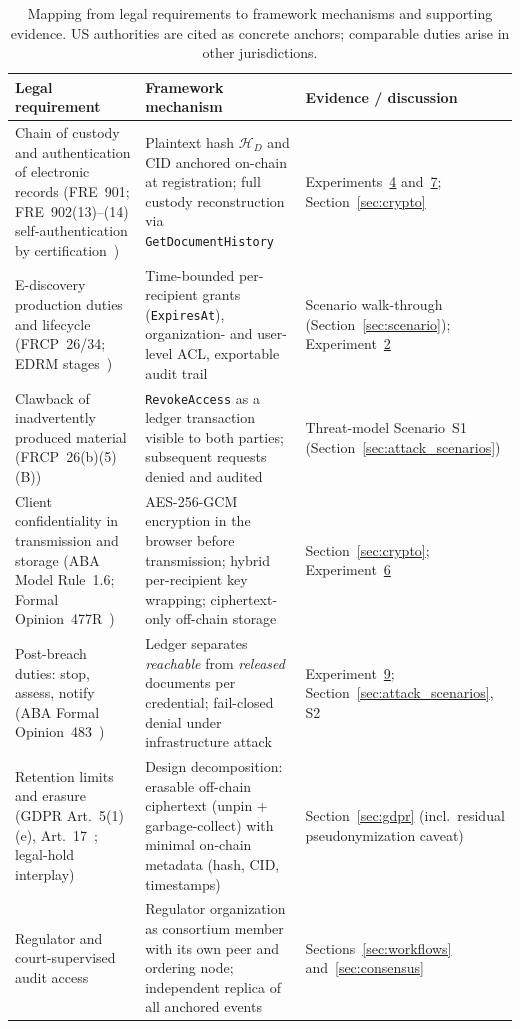 \documentclass[preprint,12pt]{elsarticle}
\begin{document}
\begin{table}[!t]
\centering
\scriptsize
\renewcommand{\arraystretch}{1.25}
\caption{Mapping from legal requirements to framework mechanisms and
supporting evidence. US authorities are cited as concrete anchors;
comparable duties arise in other jurisdictions.}
\label{tab:legal_mapping}
\begin{tabularx}{\textwidth}{@{} >{\raggedright\arraybackslash}p{3.6cm}
  >{\raggedright\arraybackslash}X
  >{\raggedright\arraybackslash}p{3.4cm} @{}}
\toprule
\textbf{Legal requirement} & \textbf{Framework mechanism} &
\textbf{Evidence / discussion} \\
\midrule
Chain of custody and authentication of electronic records
(FRE~901; FRE~902(13)--(14) self-authentication by
certification~\cite{fre902}) &
Plaintext hash $\mathcal{H}_D$ and CID anchored on-chain at
registration; full custody reconstruction via
\texttt{GetDocumentHistory} &
Experiments~\hyperref[sec:exp_audit]{4}
and~\hyperref[sec:exp_gethistory]{7};
Section~\ref{sec:crypto} \\
E-discovery production duties and lifecycle
(FRCP~26/34; EDRM stages~\cite{edrm2023}) &
Time-bounded per-recipient grants (\texttt{ExpiresAt}),
organization- and user-level ACL, exportable audit trail &
Scenario walk-through (Section~\ref{sec:scenario});
Experiment~\hyperref[sec:exp_latency]{2} \\
Clawback of inadvertently produced material
(FRCP~26(b)(5)(B)) &
\texttt{RevokeAccess} as a ledger transaction visible to both
parties; subsequent requests denied and audited &
Threat-model Scenario~S1
(Section~\ref{sec:attack_scenarios}) \\
Client confidentiality in transmission and storage
(ABA Model Rule~1.6; Formal Opinion~477R~\cite{aba477r}) &
AES-256-GCM encryption in the browser before transmission;
hybrid per-recipient key wrapping; ciphertext-only off-chain
storage &
Section~\ref{sec:crypto};
Experiment~\hyperref[sec:exp_crypto]{6} \\
Post-breach duties: stop, assess, notify
(ABA Formal Opinion~483~\cite{aba483}) &
Ledger separates \emph{reachable} from \emph{released} documents per
credential; fail-closed denial under infrastructure attack &
Experiment~\hyperref[sec:exp_failclosed]{9};
Section~\ref{sec:attack_scenarios}, S2 \\
Retention limits and erasure
(GDPR Art.~5(1)(e), Art.~17~\cite{gdpr2016}; legal-hold interplay) &
Design decomposition: erasable off-chain ciphertext (unpin +
garbage-collect) with minimal on-chain metadata (hash, CID,
timestamps) &
Section~\ref{sec:gdpr} (incl.\ residual
pseudonymization caveat) \\
Regulator and court-supervised audit access &
Regulator organization as consortium member with its own peer and
ordering node; independent replica of all anchored events &
Sections~\ref{sec:workflows}
and~\ref{sec:consensus} \\
\bottomrule
\end{tabularx}
\end{table}
\end{document}
